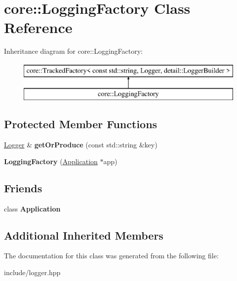 \hypertarget{classcore_1_1_logging_factory}{\section{core\-:\-:Logging\-Factory Class Reference}
\label{classcore_1_1_logging_factory}
}
Inheritance diagram for core\-:\-:Logging\-Factory\-:\begin{figure}[H]
\begin{center}
\leavevmode
\includegraphics[height=2.000000cm]{classcore_1_1_logging_factory}
\end{center}
\end{figure}
\subsection*{Protected Member Functions}
\begin{DoxyCompactItemize}
\item 
\hypertarget{classcore_1_1_logging_factory_a2d6fcf399e19c98741c86a0f9666d390}{\hyperlink{classcore_1_1_logger}{Logger} \& {\bfseries get\-Or\-Produce} (const std\-::string \&key)}\label{classcore_1_1_logging_factory_a2d6fcf399e19c98741c86a0f9666d390}

\item 
\hypertarget{classcore_1_1_logging_factory_a4972c928aee502ccff580aa1219fda5f}{{\bfseries Logging\-Factory} (\hyperlink{classcore_1_1_application}{Application} $\ast$app)}\label{classcore_1_1_logging_factory_a4972c928aee502ccff580aa1219fda5f}

\end{DoxyCompactItemize}
\subsection*{Friends}
\begin{DoxyCompactItemize}
\item 
\hypertarget{classcore_1_1_logging_factory_a23f25bcc02a0e94c2f5a4188496b04d0}{class {\bfseries Application}}\label{classcore_1_1_logging_factory_a23f25bcc02a0e94c2f5a4188496b04d0}

\end{DoxyCompactItemize}
\subsection*{Additional Inherited Members}


The documentation for this class was generated from the following file\-:\begin{DoxyCompactItemize}
\item 
include/logger.\-hpp\end{DoxyCompactItemize}
